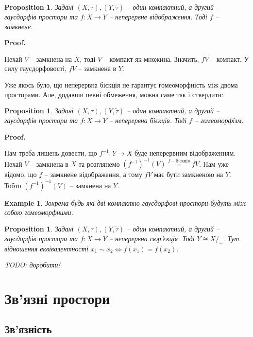 \documentclass[a4paper, 10pt]{article}
\makeatletter
\theoremstyle{theoremdd}
\newtheorem{definition}[theorem]{Definition}
\newtheorem{example}[theorem]{Example}
\newtheorem{proposition}[theorem]{Proposition}
\renewenvironment{proof}[1][Proof.\\]{\par
\pushQED{\hfill \qed}%
\normalfont \topsep6\p@\@plus6\p@\relax
\trivlist
\item\relax
{\bfseries
#1\@addpunct{.}}\hspace\labelsep\ignorespaces
}{%
\popQED\endtrivlist\@endpefalse
}
\makeatother
\begin{document}
\begin{proposition}
Задані $(X,\tau),(Y,\tilde{\tau})$ -- один компактний, а другий -- гаусдорфів простори та $f \colon X \to Y$ -- неперервне відображення. Тоді $f$ -- замкнене.
\end{proposition}

\begin{proof}
Нехай $V$ -- замкнена на $X$, тоді $V$ -- компакт як множина. Значить, $fV$ -- компакт. У силу гаусдорфовості, $fV$ -- замкнена в $Y$.
\end{proof}

\noindent Уже якось було, що неперервна бієкція не гарантує гомеоморфність між двома просторами. Але, додавши певні обмеження, можна саме так і ствердити:

\begin{proposition}
Задані $(X,\tau),(Y,\tilde{\tau})$ -- один компактний, а другий -- гаусдорфів простори та $f \colon X \to Y$ -- неперервна бієкція. Тоді $f$ -- гомеоморфізм.
\end{proposition}

\begin{proof}
Нам треба лишень довести, що $f^{-1} \colon Y \to X$ буде неперервним відображенням.\\
Нехай $V$ -- замкнена в $X$ та розглянемо $(f^{-1})^{-1}(V) \overset{f \text{ -- бієкція}}{=} fV$. Нам уже відомо, що $f$ -- замкнене відображення, а тому $fV$ має бути замкненою на $Y$. Тобто $(f^{-1})^{-1}(V)$ -- замкнена на $Y$.
\end{proof}

\begin{example}
Зокрема будь-які дві компактно-гаусдорфові простори будуть між собою гомеоморфними.
\end{example}

\begin{proposition}
Задані $(X,\tau),(Y,\tilde{\tau})$ -- один компактний, а другий -- гаусдорфів простори та $f \colon X \to Y$ -- неперервна сюр'єкція. Тоді $Y \cong X/_\sim$. Тут відношення еквівалентності $x_1 \sim x_2 \iff f(x_1) = f(x_2)$.
\end{proposition}

\textit{TODO: доробити!}
\newpage

\section{Зв'язні простори}
\subsection{Зв'язність}
\iffalse
\begin{definition}
Задано $(X,\tau)$ -- топологічний простір.\\
Ми назвемо простір \textbf{зв'язним}, якщо $X \neq \emptyset$ та
\begin{align*}
\exists U,V \in \tau: X = U \sqcup V \implies U = \emptyset \text{ або } V = \emptyset
\end{align*}
У протилежному випадку ми будемо це називати \textbf{незв'язним}.
\end{definition}
\fi
\end{document}
